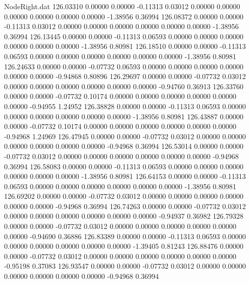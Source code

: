 \begin{filecontents}{NodeRight.dat}
 126.03310    0.00000    0.00000    -0.11313    0.03012    0.00000    0.00000    0.00000    0.00000    0.00000    0.00000   -1.38956    0.36994
 126.08372    0.00000    0.00000    -0.11313    0.03012    0.00000    0.00000    0.00000    0.00000    0.00000    0.00000   -1.38956    0.36994
 126.13445    0.00000    0.00000    -0.11313    0.06593    0.00000    0.00000    0.00000    0.00000    0.00000    0.00000   -1.38956    0.80981
 126.18510    0.00000    0.00000    -0.11313    0.06593    0.00000    0.00000    0.00000    0.00000    0.00000    0.00000   -1.38956    0.80981
 126.24633    0.00000    0.00000    -0.07732    0.06593    0.00000    0.00000    0.00000    0.00000    0.00000    0.00000   -0.94868    0.80896
 126.29697    0.00000    0.00000    -0.07732    0.03012    0.00000    0.00000    0.00000    0.00000    0.00000    0.00000   -0.94760    0.36913
 126.33760    0.00000    0.00000    -0.07732    0.10174    0.00000    0.00000    0.00000    0.00000    0.00000    0.00000   -0.94955    1.24952
 126.38828    0.00000    0.00000    -0.11313    0.06593    0.00000    0.00000    0.00000    0.00000    0.00000    0.00000   -1.38956    0.80981
 126.43887    0.00000    0.00000    -0.07732    0.10174    0.00000    0.00000    0.00000    0.00000    0.00000    0.00000   -0.94968    1.24969
 126.47945    0.00000    0.00000    -0.07732    0.03012    0.00000    0.00000    0.00000    0.00000    0.00000    0.00000   -0.94968    0.36994
 126.53014    0.00000    0.00000    -0.07732    0.03012    0.00000    0.00000    0.00000    0.00000    0.00000    0.00000   -0.94968    0.36994
 126.58083    0.00000    0.00000    -0.11313    0.06593    0.00000    0.00000    0.00000    0.00000    0.00000    0.00000   -1.38956    0.80981
 126.64153    0.00000    0.00000    -0.11313    0.06593    0.00000    0.00000    0.00000    0.00000    0.00000    0.00000   -1.38956    0.80981
 126.69202    0.00000    0.00000    -0.07732    0.03012    0.00000    0.00000    0.00000    0.00000    0.00000    0.00000   -0.94968    0.36994
 126.74263    0.00000    0.00000    -0.07732    0.03012    0.00000    0.00000    0.00000    0.00000    0.00000    0.00000   -0.94937    0.36982
 126.79328    0.00000    0.00000    -0.07732    0.03012    0.00000    0.00000    0.00000    0.00000    0.00000    0.00000   -0.94690    0.36886
 126.83389    0.00000    0.00000    -0.11313    0.06593    0.00000    0.00000    0.00000    0.00000    0.00000    0.00000   -1.39405    0.81243
 126.88476    0.00000    0.00000    -0.07732    0.03012    0.00000    0.00000    0.00000    0.00000    0.00000    0.00000   -0.95198    0.37083
 126.93547    0.00000    0.00000    -0.07732    0.03012    0.00000    0.00000    0.00000    0.00000    0.00000    0.00000   -0.94968    0.36994

\end{filecontents}
